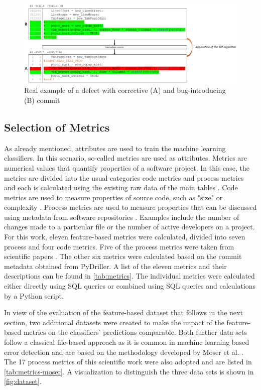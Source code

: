 \begin{figure}[ht]
    \centering
    \includegraphics[width=\textwidth]{Bug_example_real}
    \caption{Real example of a defect with corrective (A) and bug-introducing (B) commit\label{fig:bug-example}}
\end{figure}


\subsection{Selection of Metrics}

As already mentioned, attributes are used to train the machine learning classifiers. In this scenario, so-called metrics are used as attributes. Metrics are numerical values that quantify properties of a software project. In this case, the metrics are divided into the usual categories code metrics and process metrics and each is calculated using the existing raw data of the main tables \cite{Rahman2013}. Code metrics are used to measure properties of source code, such as "size" or complexity \cite{Rahman2013}. Process metrics are used to measure properties that can be discussed using metadata from software repositories \cite{Rahman2013}. Examples include the number of changes made to a particular file or the number of active developers on a project. For this work, eleven feature-based metrics were calculated, divided into seven process and four code metrics. Five of the process metrics were taken from scientific papers \cite{Rahman2013,Queiroz2016}. The other six metrics were calculated based on the commit metadata obtained from PyDriller. A list of the eleven metrics and their descriptions can be found in \autoref{tab:metrics}. The individual metrics were calculated either directly using SQL queries or combined using SQL queries and calculations by a Python script.

In view of the evaluation of the feature-based dataset that follows in the next section, two additional datasets were created to make the impact of the feature-based metrics on the classifiers' predictions comparable. Both further data sets follow a classical file-based approach as it is common in machine learning based error detection and are based on the methodology developed by Moser et al. \cite{Moser2008}. The 17 process metrics of this scientific work were also adopted and are listed in \autoref{tab:metrics-moser}. A visualization to distinguish the three data sets is shown in \autoref{fig:dataset}.

